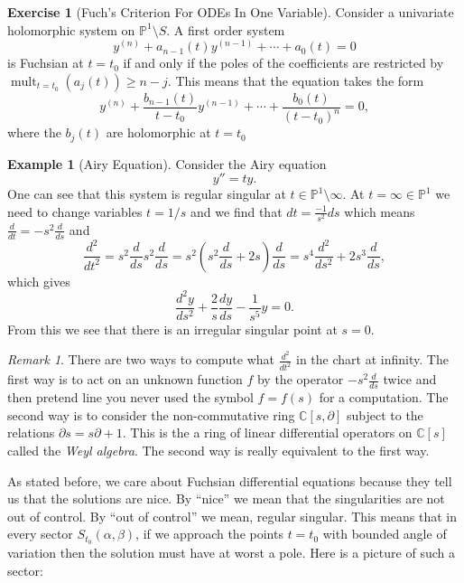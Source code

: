 \documentclass[]{book}
\numberwithin{equation}{section}
\theoremstyle{definition}
\newtheorem{example}[theorem]{Example}
\newtheorem{exercise}[theorem]{Exercise}
\theoremstyle{remark}
\newtheorem{remark}[theorem]{Remark}
\newcommand{\CC}{\mathbb{C}}
\newcommand{\PP}{\mathbb{P}}
\newcommand{\mult}{\operatorname{mult}}
\begin{document}
\begin{exercise}[Fuch's Criterion For ODEs In One Variable]
	Consider a univariate holomorphic system on $\PP^1\setminus S$. 
	A first order system 
	 $$ y^{(n)} + a_{n-1}(t) y^{(n-1)} + \cdots + a_0(t)=0 $$
	is Fuchsian at $t=t_0$ if and only if  the poles of the coefficients are restricted by $\mult_{t=t_0}( a_j(t) ) \geq n-j $.
	This means that the equation takes the form
	 	 $$ y^{(n)} + \frac{b_{n-1}(t)}{t-t_0} y^{(n-1)} + \cdots + \frac{b_{0}(t)}{(t-t_0)^n} =0, $$
	where the $b_j(t)$ are holomorphic at $t=t_0$
\end{exercise}

\begin{example}[Airy Equation]
	Consider the Airy equation 
	 $$ y'' = ty.$$
	One can see that this system is regular singular at $t \in \PP^1\setminus \infty$.  
	At $t=\infty \in \PP^1$ we need to change variables $t=1/s$ and we find that $dt = \frac{-1}{s^2}ds$ which means $\frac{d}{dt} = -s^2 \frac{d}{ds}$ and $$\frac{d^2}{dt^2} = s^2 \frac{d}{ds} s^2 \frac{d}{ds}= s^2 (s^2\frac{d}{ds} + 2s)\frac{d}{ds} = s^4\frac{d^2}{ds^2}+2s^3 \frac{d}{ds},$$
	which gives 
	 $$ \frac{d^2y}{ds^2}+ \frac{2}{s} \frac{dy}{ds} - \frac{1}{s^5} y=0. $$
	From this we see that there is an irregular singular point at $s=0$.
\end{example}

\begin{remark}
	There are two ways to compute what $\frac{d^2}{dt^2}$ in the chart at infinity. 
	The first way is to act on an unknown function $f$ by the operator $-s^2 \frac{d}{ds}$ twice and then pretend line you never used the symbol $f=f(s)$ for a computation.
	The second way is to consider the non-commutative ring $\CC[s,\partial]$ subject to the relations $\partial s = s\partial + 1$. 
	This is the a ring of linear differential operators on $\CC[s]$ called the \emph{Weyl algebra}.
	The second way is really equivalent to the first way.
\end{remark}

As stated before, we care about Fuchsian differential equations because they tell us that the solutions are nice. 
By ``nice'' we mean that the singularities are not out of control.
By ``out of control'' we mean, regular singular. 
This means that in every sector $S_{t_0}(\alpha,\beta)$, if we approach the points $t=t_0$ with bounded angle of variation then the solution must have at worst a pole.
Here is a picture of such a sector:
\end{document}
